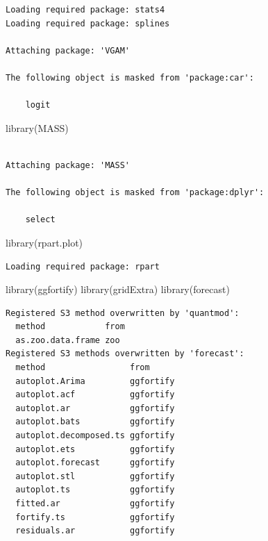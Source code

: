 \documentclass[
  letterpaper,
  DIV=11,
  numbers=noendperiod]{scrartcl}
\newenvironment{Shaded}{\begin{snugshade}}{\end{snugshade}}
\newcommand{\FunctionTok}[1]{\textcolor[rgb]{0.28,0.35,0.67}{#1}}
\newcommand{\NormalTok}[1]{\textcolor[rgb]{0.00,0.23,0.31}{#1}}
\begin{document}
\begin{verbatim}
Loading required package: stats4
Loading required package: splines

Attaching package: 'VGAM'

The following object is masked from 'package:car':

    logit
\end{verbatim}

\begin{Shaded}
\begin{Highlighting}[]
\FunctionTok{library}\NormalTok{(MASS)}
\end{Highlighting}
\end{Shaded}

\begin{verbatim}

Attaching package: 'MASS'

The following object is masked from 'package:dplyr':

    select
\end{verbatim}

\begin{Shaded}
\begin{Highlighting}[]
\FunctionTok{library}\NormalTok{(rpart.plot)}
\end{Highlighting}
\end{Shaded}

\begin{verbatim}
Loading required package: rpart
\end{verbatim}

\begin{Shaded}
\begin{Highlighting}[]
\FunctionTok{library}\NormalTok{(ggfortify)}
\FunctionTok{library}\NormalTok{(gridExtra)}
\FunctionTok{library}\NormalTok{(forecast)}
\end{Highlighting}
\end{Shaded}

\begin{verbatim}
Registered S3 method overwritten by 'quantmod':
  method            from
  as.zoo.data.frame zoo 
Registered S3 methods overwritten by 'forecast':
  method                 from     
  autoplot.Arima         ggfortify
  autoplot.acf           ggfortify
  autoplot.ar            ggfortify
  autoplot.bats          ggfortify
  autoplot.decomposed.ts ggfortify
  autoplot.ets           ggfortify
  autoplot.forecast      ggfortify
  autoplot.stl           ggfortify
  autoplot.ts            ggfortify
  fitted.ar              ggfortify
  fortify.ts             ggfortify
  residuals.ar           ggfortify
\end{verbatim}
\end{document}
